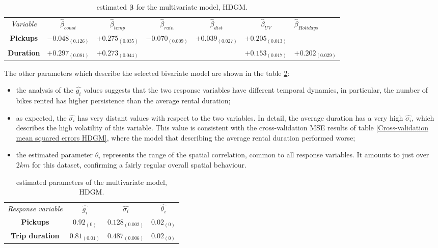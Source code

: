\begin{table}
	\centering
	\renewcommand\arraystretch{1.3}
	\begin{tabular}{|ccccccl}
		\hline
		\textit{Variable} & $\hat{\beta}_{const}$  & $\hat{\beta}_{temp}$ & $\hat{\beta}_{rain}$ & $\hat{\beta}_{dist}$ & $\hat{\beta}_{UV}$ &$\hat{\beta}_{Holidays}$      \\ \cline{2-7} 
		\multicolumn{1}{|c|}{\textbf{Pickups}}  & $-0.048_{(0.126)}$ & $+0.275_{(0.035)}$ & $-0.070_{(0.009)}$ & $+0.039_{(0.027)}$ & $+0.205_{(0.013)}$ &              \\
		\multicolumn{1}{|c|}{\textbf{Duration}} & $+0.297_{(0.081)}$  & $+0.273_{(0.044)}$ &               &               & $+0.153_{(0.017)}$  & $+0.202_{(0.029)}$
	\end{tabular}
	\caption[Estimated $\boldsymbol{\beta}$ for the multivariate model (HDGM)]{estimated $\boldsymbol{\beta}$ for the multivariate model, HDGM.}
	\label{Bivariate Beta HDGM}
\end{table}

\noindent
The other parameters which describe the selected bivariate model are shown in the table \ref{Bivariate Param_HDGM}:
\begin{itemize}
	\item the analysis of the $\hat{g_i}$ values suggests that the two response variables have different temporal dynamics, in particular, the number of bikes rented has higher persistence than the average rental duration;
	\item as expected, the $\hat{\sigma_i}$ has very distant values with respect to the two variables. In detail, the average duration has a very high $\hat{\sigma_i}$, which describes the high volatility of this variable. This value is consistent with the cross-validation MSE results of table \ref{Cross-validation mean squared errors HDGM}, where the model that describing the average rental duration performed worse;
	\item the estimated parameter $\theta_i$ represents the range of the spatial correlation, common to all response variables. It amounts to just over $2 km$ for this dataset, confirming a fairly regular overall spatial behaviour.
\end{itemize}

\begin{table}
	\centering
	\renewcommand\arraystretch{1.3}
	\begin{tabular}{|cccc}
		\hline
		\textit{Response variable} & $\hat{g_i}$  & $\hat{\sigma_i}$ & $\hat{\theta_i}$  \\ \cline{2-4} 
		\multicolumn{1}{|c|}{\textbf{Pickups}}  &  $0.92_{(0)}$ &  $0.128_{(0.002)}$ & \multicolumn{1}{c}{$0.02_{(0)}$ } \\
		\multicolumn{1}{|c|}{\textbf{Trip duration}} &  $0.81_{(0.01)}$ &  $0.487_{(0.006)}$ &     $0.02_{(0)}$                              
	\end{tabular}
	\caption[Estimated parameters of the multivariate model (HDGM)]{estimated parameters of the multivariate model, HDGM.}
	\label{Bivariate Param_HDGM}
\end{table}